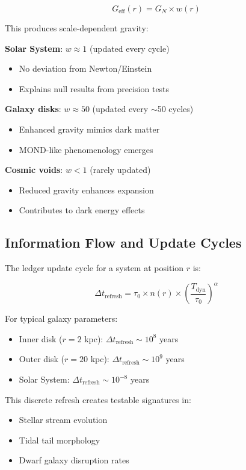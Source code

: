 \documentclass[12pt,letterpaper]{article}
\newcommand{\geff}{G_{\text{eff}}}
\newcommand{\gnewton}{G_N}
\newcommand{\tdyn}{T_{\text{dyn}}}
\begin{document}
\begin{equation}
\geff(r) = \gnewton \times w(r)
\label{eq:G_eff}
\end{equation}

This produces scale-dependent gravity:

\textbf{Solar System}: $w \approx 1$ (updated every cycle)
\begin{itemize}
\item No deviation from Newton/Einstein
\item Explains null results from precision tests
\end{itemize}

\textbf{Galaxy disks}: $w \approx 50$ (updated every $\sim$50 cycles)
\begin{itemize}
\item Enhanced gravity mimics dark matter
\item MOND-like phenomenology emerges
\end{itemize}

\textbf{Cosmic voids}: $w < 1$ (rarely updated)
\begin{itemize}
\item Reduced gravity enhances expansion
\item Contributes to dark energy effects
\end{itemize}

\subsection{Information Flow and Update Cycles}

The ledger update cycle for a system at position $r$ is:

\begin{equation}
\Delta t_{\text{refresh}} = \tau_0 \times n(r) \times \left(\frac{\tdyn}{\tau_0}\right)^\alpha
\label{eq:dt_refresh}
\end{equation}

For typical galaxy parameters:
\begin{itemize}
\item Inner disk ($r = 2$ kpc): $\Delta t_{\text{refresh}} \sim 10^8$ years
\item Outer disk ($r = 20$ kpc): $\Delta t_{\text{refresh}} \sim 10^9$ years
\item Solar System: $\Delta t_{\text{refresh}} \sim 10^{-8}$ years
\end{itemize}

This discrete refresh creates testable signatures in:
\begin{itemize}
\item Stellar stream evolution
\item Tidal tail morphology
\item Dwarf galaxy disruption rates
\end{itemize}
\end{document}
